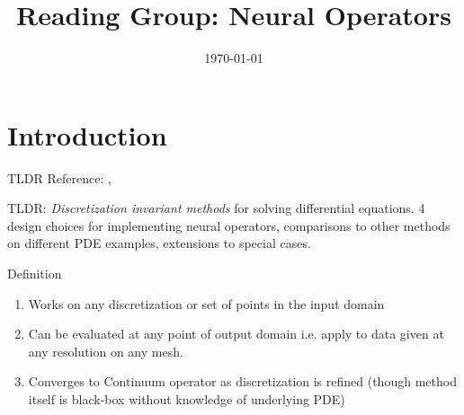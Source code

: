 \documentclass[usenames,dvipsnames]{beamer}
\title[Journal Club]{Reading Group: Neural Operators} %
\date{\today}
\theoremstyle{definition}
\begin{document}
\begin{frame}
\titlepage %
\end{frame}



\section{Introduction}
\begin{frame}{TLDR}
    Reference: \cite{Kovachki2023}, \cite{li_fourier_2021}

    TLDR: \emph{Discretization invariant methods} for solving differential equations. 4 design choices for implementing neural operators, comparisons to other methods on different PDE examples, extensions to special cases.
\end{frame}

\begin{frame}{Definition}
    \begin{enumerate}
        \item Works on any discretization or set of points in the input domain 

        \item Can be evaluated at any point of output domain i.e. apply to data given at any resolution on any mesh.

        \item Converges to Continuum operator as discretization is refined (though method itself is black-box without knowledge of underlying PDE)
    \end{enumerate}
\end{frame}
\end{document}
